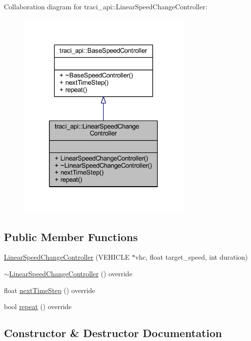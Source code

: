 Collaboration diagram for traci\+\_\+api\+:\+:Linear\+Speed\+Change\+Controller\+:
\nopagebreak
\begin{figure}[H]
\begin{center}
\leavevmode
\includegraphics[width=246pt]{classtraci__api_1_1_linear_speed_change_controller__coll__graph}
\end{center}
\end{figure}
\subsection*{Public Member Functions}
\begin{DoxyCompactItemize}
\item 
\hyperlink{classtraci__api_1_1_linear_speed_change_controller_a60f7ef2214d9cd72e7393293c234afa5}{Linear\+Speed\+Change\+Controller} (V\+E\+H\+I\+C\+LE $\ast$vhc, float target\+\_\+speed, int duration)
\item 
\hyperlink{classtraci__api_1_1_linear_speed_change_controller_abb54e5cb6b7befd773ce9bf28df1779f}{$\sim$\+Linear\+Speed\+Change\+Controller} () override
\item 
float \hyperlink{classtraci__api_1_1_linear_speed_change_controller_a31e52d6f77c96a88dda160226335bacd}{next\+Time\+Step} () override
\item 
bool \hyperlink{classtraci__api_1_1_linear_speed_change_controller_aaa5f31ea0c57db838a5786509fc03446}{repeat} () override
\end{DoxyCompactItemize}


\subsection{Constructor \& Destructor Documentation}
\mbox{\label{classtraci__api_1_1_linear_speed_change_controller_a60f7ef2214d9cd72e7393293c234afa5}} 
